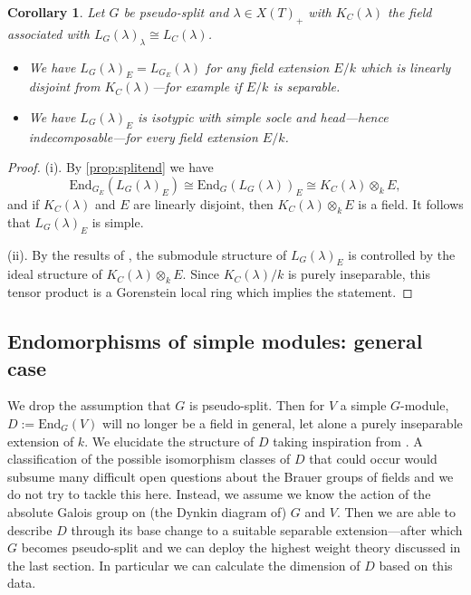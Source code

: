 \documentclass[11pt,reqno]{amsart}
\newtheorem{cor}[lemma]{Corollary}
\theoremstyle{definition}
\theoremstyle{remark}
\theoremstyle{definition}
\theoremstyle{plain}
\newcommand{\End}{\mathrm{End}}
\begin{document}
\begin{cor}\label{cor:sepclosedsimple}
Let $G$ be pseudo-split and $\lambda\in X(T)_+$ with $K_C(\lambda)$ the field associated with $L_G(\lambda)_\lambda\cong L_C(\lambda)$. 
\begin{itemize}
\item[(i)] We have $L_G(\lambda)_E = L_{G_{E}}(\lambda)$ for any field extension $E/k$ which is linearly disjoint from $K_C(\lambda)$---for example if $E/k$ is separable.
\item[(ii)] We have $L_G(\lambda)_E$ is isotypic with simple socle and head---hence indecomposable---for every field extension $E/k$.
\end{itemize}
\end{cor}

\begin{proof} 
(i). By \cref{prop:splitend} we have \[\End_{G_{E}}(L_G(\lambda)_{E})\cong \End_G(L_G(\lambda))_{E}\cong K_C(\lambda)\otimes_k E,\]
and if $K_C(\lambda)$ and $E$ are linearly disjoint, then $K_C(\lambda) \otimes_k E$ is a field. 
It follows that $L_G(\lambda)_{E}$ is simple.

(ii). By the results of , the submodule structure of $L_G(\lambda)_E$ is controlled by the ideal structure of $K_C(\lambda)\otimes_k E$.
Since $K_C(\lambda)/k$ is purely inseparable, this tensor product is a Gorenstein local ring which implies the statement.
\end{proof}



\subsection{Endomorphisms of simple modules: general case}\label{sec:endsimple2}
We drop the assumption that $G$ is pseudo-split. Then for $V$ a simple $G$-module, $D:=\End_G(V)$ will no longer be a field in general, let alone a purely inseparable extension of $k$. We  elucidate the structure of $D$ taking inspiration from \cite{Tit71}.
A classification of the possible isomorphism classes of $D$ that could occur would subsume many difficult open questions about the Brauer groups of fields and we do not try to tackle this here. Instead, we assume we know the action of the absolute Galois group on (the Dynkin diagram of) $G$ and $V$. Then we are able to describe $D$ through its base change to a suitable separable extension---after which $G$ becomes pseudo-split and we can deploy the highest weight theory discussed in the last section. 
In particular we can calculate the dimension of $D$ based on this data.
\end{document}
